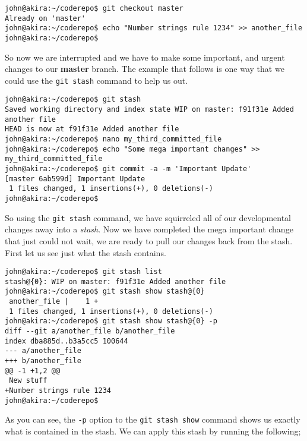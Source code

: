\begin{Verbatim}[frame=leftline,framerule=1mm,fontsize=\relsize{-3}] 
john@akira:~/coderepo$ git checkout master
Already on 'master'
john@akira:~/coderepo$ echo "Number strings rule 1234" >> another_file 
john@akira:~/coderepo$ 
\end{Verbatim}

So now we are interrupted and we have to make some important, and urgent changes to our \textbf{master} branch.  The example that follows is one way that we could use the \texttt{git stash} command to help us out.  

\begin{Verbatim}[frame=leftline,framerule=1mm,fontsize=\relsize{-3}] 
john@akira:~/coderepo$ git stash
Saved working directory and index state WIP on master: f91f31e Added another file
HEAD is now at f91f31e Added another file
john@akira:~/coderepo$ nano my_third_committed_file 
john@akira:~/coderepo$ echo "Some mega important changes" >> my_third_committed_file 
john@akira:~/coderepo$ git commit -a -m 'Important Update'
[master 6ab599d] Important Update
 1 files changed, 1 insertions(+), 0 deletions(-)
john@akira:~/coderepo$ 
\end{Verbatim}

So using the \texttt{git stash} command, we have squirreled all of our developmental changes away into a \emph{stash}.  Now we have completed the mega important change that just could not wait, we are ready to pull our changes back from the stash.  First let us see just what the stash contains.

\begin{Verbatim}[frame=leftline,framerule=1mm,fontsize=\relsize{-3}] 
john@akira:~/coderepo$ git stash list
stash@{0}: WIP on master: f91f31e Added another file
john@akira:~/coderepo$ git stash show stash@{0}
 another_file |    1 +
 1 files changed, 1 insertions(+), 0 deletions(-)
john@akira:~/coderepo$ git stash show stash@{0} -p
diff --git a/another_file b/another_file
index dba885d..b3a5cc5 100644
--- a/another_file
+++ b/another_file
@@ -1 +1,2 @@
 New stuff
+Number strings rule 1234
john@akira:~/coderepo$ 
\end{Verbatim}

As you can see, the \texttt{-p} option to the \texttt{git stash show} command shows us exactly what is contained in the stash.  We can apply this stash by running the following;

